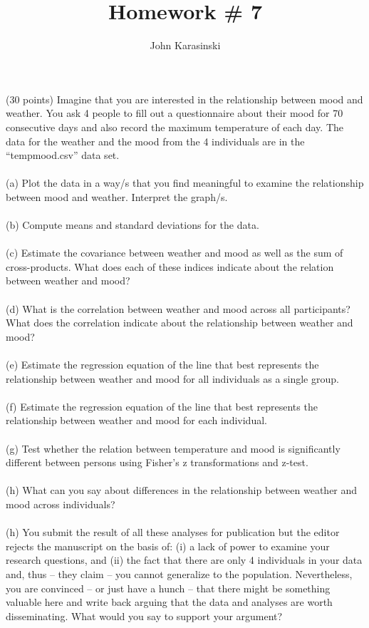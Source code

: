 \documentclass[onecolumn,10pt]{jhwhw}
\author{John Karasinski}
\title{Homework \# 7}
\begin{document}

\problem{}
(30 points) Imagine that you are interested in the relationship between mood and weather. You ask 4 people to fill out a questionnaire about their mood for 70 consecutive days and also record the maximum temperature of each day. The data for the weather and the mood from the 4 individuals are in the “tempmood.csv” data set.\\
\\
(a) Plot the data in a way/s that you find meaningful to examine the relationship between mood and weather. Interpret the graph/s.\\
\\
(b) Compute means and standard deviations for the data.\\
\\
(c) Estimate the covariance between weather and mood as well as the sum of cross-products. What does each of these indices indicate about the relation between weather and mood?\\
\\
(d) What is the correlation between weather and mood across all participants? What does the correlation indicate about the relationship between weather and mood?\\
\\
(e) Estimate the regression equation of the line that best represents the relationship between weather and mood for all individuals as a single group.\\
\\
(f) Estimate the regression equation of the line that best represents the relationship between weather and mood for each individual.\\
\\
(g) Test whether the relation between temperature and mood is significantly different between persons using Fisher’s z transformations and z-test.\\
\\
(h) What can you say about differences in the relationship between weather and mood across individuals?\\
\\
(h) You submit the result of all these analyses for publication but the editor rejects the manuscript on the basis of: (i) a lack of power to examine your research questions, and (ii) the fact that there are only 4 individuals in your data and, thus – they claim – you cannot generalize to the population. Nevertheless, you are convinced – or just have a hunch – that there might be something valuable here and write back arguing that the data and analyses are worth disseminating. What would you say to support your argument?\\
\end{document}
